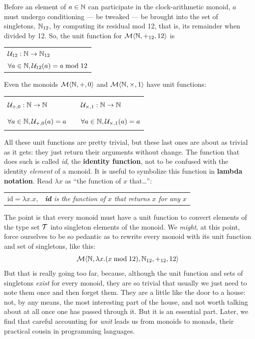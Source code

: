 Before an element of $a\in\mathbb{N}$ can participate in the clock-arithmetic monoid, $a$ must undergo conditioning --- be tweaked --- be brought into the set of singletons, $\mathbb{N}_{12}$, by computing its residual mod 12, that is, its remainder when divided by 12. So, the unit function for $\mathcal{M}\langle{\mathbb{N}},{+_{12}},{12}\rangle$ is
\begin{center}
  \begin{tabular}{l}
    $\mathcal{U}_{12}:\mathbb{N}\rightarrow\mathbb{N}_{12}$\\
    $\forall a \in \mathbb{N}, \mathcal{U}_{12}(a)=a \bmod 12$\\
  \end{tabular}
\end{center}
Even the monoids $\mathcal{M}\langle{\mathbb{N}},{+},{0}\rangle$ and $\mathcal{M}\langle{\mathbb{N}},{\times},{1}\rangle$ have unit functions:
\begin{center}
  \begin{tabular}{lcl}
    $\mathcal{U}_{+,0}:\mathbb{N}\rightarrow\mathbb{N}$ & \rule{5ex}{0ex} &
    $\mathcal{U}_{\times,1}:\mathbb{N}\rightarrow\mathbb{N}$ \\
    $\forall a \in \mathbb{N}, \mathcal{U}_{+,0}(a)=a$ & \rule{5ex}{0ex} &
    $\forall a \in \mathbb{N}, \mathcal{U}_{\times,1}(a)=a$\\
  \end{tabular}
\end{center}


All these unit functions are pretty trivial, but these last ones are about as trivial as it gets: they just return their arguments without change. The function that does such is called \emph{id}, the \textbf{identity function}, not to be confused with the identity \emph{element} of a monoid. It is useful to symbolize this function in \textbf{lambda notation}. Read $\lambda x$ as ``the function of $x$ that\ldots'':
\begin{center}
  \begin{tabular}{ll}
    $\mathrm{id}=\lambda x.x$, & \emph{\textbf{id} is the function of $x$ that returns $x$ for any $x$}\\
  \end{tabular}
\end{center}


The point is that every monoid must have a unit function to convert elements of the type set $\mathcal{T}$ into singleton elements of the monoid. We \emph{might}, at this point, force ourselves to be so pedantic as to rewrite every monoid with its unit function and set of singletons, like this:
\[ \mathcal{M}\langle\mathbb{N},\lambda x.(x\bmod 12),\mathbb{N}_{12},+_{12},12\rangle \]
But that is really going too far, because, although the unit function and sets of singletons \emph{exist} for every monoid, they are so trivial that usually we just need to note them once and then forget them. They are a little like the door to a house: not, by any means, the most interesting part of the house, and not worth talking about at all once one has passed through it. But it is an essential part. Later, we find that careful accounting for \emph{unit} leads us from monoids to monads, their practical cousin in programming languages.


